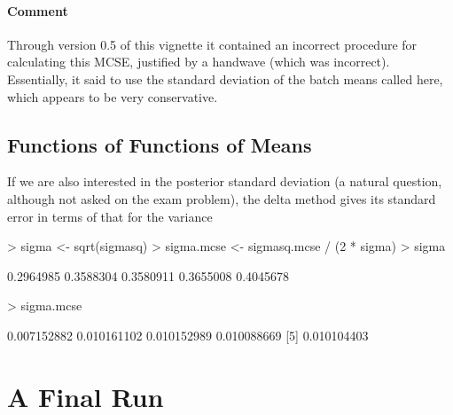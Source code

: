 \documentclass{article}
\begin{document}
\paragraph{Comment} Through version 0.5 of this vignette it contained
an incorrect procedure for calculating this MCSE, justified by a handwave
(which was incorrect).
Essentially, it said to use the standard deviation of the batch means called
\verb@v@ here, which appears to be very conservative.

\subsection{Functions of Functions of Means}

If we are also interested in the posterior standard deviation
(a natural question, although not asked on the exam problem),
the delta method gives its standard error in terms of that
for the variance
\begin{Schunk}
\begin{Sinput}
> sigma <- sqrt(sigmasq)
> sigma.mcse <- sigmasq.mcse / (2 * sigma)
> sigma
\end{Sinput}
\begin{Soutput}
[1] 0.2964985 0.3588304 0.3580911 0.3655008 0.4045678
\end{Soutput}
\begin{Sinput}
> sigma.mcse
\end{Sinput}
\begin{Soutput}
[1] 0.007152882 0.010161102 0.010152989 0.010088669
[5] 0.010104403
\end{Soutput}
\end{Schunk}

\section{A Final Run}
\end{document}
